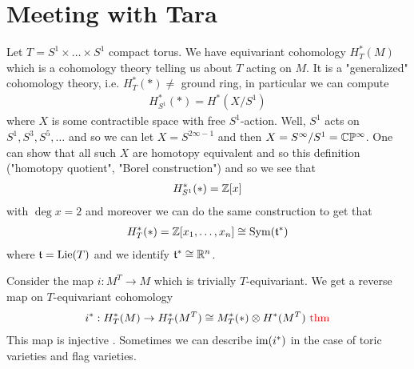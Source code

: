 \documentclass[12pt]{article}
\begin{document}


\section{Meeting with Tara}
Let $T = S^1\times \dots \times S^1$ compact torus. We have equivariant cohomology $H^*_T(M)$ which is a cohomology theory telling us about $T$ acting on $M$. It is a "generalized" cohomology theory, i.e. $H_T^*(*) \neq $ ground ring, in particular we can compute \begin{align*}
    H^*_{S^1}(*) = H^*(X/S^1)
\end{align*} where $X$ is some contractible space with free $S^1$-action. Well, $S^1$ acts on $S^1,S^3,S^5,\dots$ and so we can let $X = S^{2\infty -1}$ and then $X = S^\infty/ S^1 = \mathbb{C}\mathbb{P}^\infty$. One can show that all such $X$ are homotopy equivalent and so this definition ("homotopy quotient", "Borel construction") and so we see that \begin{align*}
    H^*_{S^1}(*) = \mathbb{Z}[x]
\end{align*} with $\deg x = 2$ and moreover we can do the same construction to get that \begin{align*}
    H^*_{T}(*) = \mathbb{Z}[x_1,\dots,x_n] \cong \operatorname{Sym}(\mathfrak{t}^*)
\end{align*} where $\mathfrak{t} = \operatorname{Lie}(T)$ and we identify $\mathfrak{t}^*\cong\mathbb{R}^n$. 

\hfill

Consider the map $i:M^T\to M$ which is trivially $T$-equivariant. We get a reverse map on $T$-equivariant cohomology \begin{align*}
    i^*:H^*_T(M) \to H_T^*(M^T) \cong M^*_T(*)\otimes H^*(M^T) \text{ \textcolor{red}{{thm}}}
\end{align*} This map is injective . Sometimes we can describe $\operatorname{im}(i^*)$ in the case of toric varieties and flag varieties.  

\hfill
\end{document}
